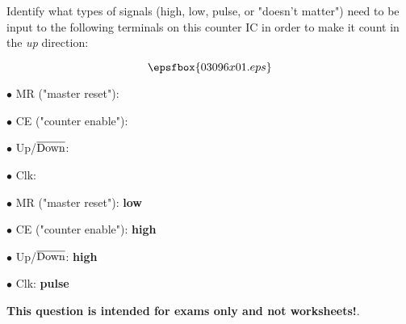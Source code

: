 

Identify what types of signals (high, low, pulse, or "doesn't matter") need to be input to the following terminals on this counter IC in order to make it count in the {\it up} direction:

$$\epsfbox{03096x01.eps}$$

\medskip
\item{$\bullet$} MR ("master reset"):
\vskip 5pt
\item{$\bullet$} CE ("counter enable"):
\vskip 5pt
\item{$\bullet$} Up/$\overline{\hbox{Down}}$:
\vskip 5pt
\item{$\bullet$} Clk:
\medskip







\medskip
\item{$\bullet$} MR ("master reset"): {\bf low}
\vskip 5pt
\item{$\bullet$} CE ("counter enable"): {\bf high}
\vskip 5pt
\item{$\bullet$} Up/$\overline{\hbox{Down}}$: {\bf high}
\vskip 5pt
\item{$\bullet$} Clk: {\bf pulse}
\medskip







{\bf This question is intended for exams only and not worksheets!}.




